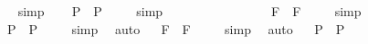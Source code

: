 \begin{isabellebody}
\isadelimproof
\ %
\endisadelimproof
%
\isatagproof
{}\isamarkupfalse%
\ simp\ \isamarkupfalse%
%
\endisatagproof
{\isafoldproof}%
%
\isadelimproof
%
\endisadelimproof
\isanewline
\ \isamarkupfalse%
\ {\isachardoublequoteopen}{\isacharbrackleft}\isactrlbold {\isasymbox}\isactrlbold {\isasymdiamond}{\isasymphi}\isactrlsup P\ \isactrlbold {\isasymrightarrow}\ \isactrlbold {\isasymdiamond}{\isasymphi}\isactrlsup P{\isacharbrackright}\ {\isacharequal}\ {\isasymtop}{\isachardoublequoteclose}%
\isadelimproof
\ %
\endisadelimproof
%
\isatagproof
{}\isamarkupfalse%
\ simp\ \isamarkupfalse%
\ \ \ \ \ \ \ \ \ \ \ \ %
%
\endisatagproof
{\isafoldproof}%
%
\isadelimproof
%
\endisadelimproof
\isanewline
\ \isamarkupfalse%
\ {\isachardoublequoteopen}{\isacharbrackleft}\isactrlbold {\isasymbox}\isactrlbold {\isasymdiamond}{\isasymphi}\isactrlsup F\ \isactrlbold {\isasymrightarrow}\ \isactrlbold {\isasymdiamond}{\isasymphi}\isactrlsup F{\isacharbrackright}\ {\isacharequal}\ {\isasymtop}{\isachardoublequoteclose}%
\isadelimproof
\ %
\endisadelimproof
%
\isatagproof
{}\isamarkupfalse%
\ simp\ \isamarkupfalse%
\ \ \ \ \ \ \ \ \ \ \ \ %
%
\endisatagproof
{\isafoldproof}%
%
\isadelimproof
%
\endisadelimproof
\isanewline
\ \isamarkupfalse%
\ {\isachardoublequoteopen}{\isacharbrackleft}\isactrlbold {\isasymdiamond}\isactrlbold {\isasymbox}{\isasymphi}\isactrlsup P\ \isactrlbold {\isasymrightarrow}\ \isactrlbold {\isasymdiamond}{\isasymphi}\isactrlsup P{\isacharbrackright}\ {\isacharequal}\ {\isasymtop}{\isachardoublequoteclose}%
\isadelimproof
\ %
\endisadelimproof
%
\isatagproof
{}\isamarkupfalse%
\ simp\ \isamarkupfalse%
\ auto%
\endisatagproof
{\isafoldproof}%
%
\isadelimproof
%
\endisadelimproof
\isanewline
\ \isamarkupfalse%
\ {\isachardoublequoteopen}{\isacharbrackleft}\isactrlbold {\isasymdiamond}\isactrlbold {\isasymbox}{\isasymphi}\isactrlsup F\ \isactrlbold {\isasymrightarrow}\ \isactrlbold {\isasymdiamond}{\isasymphi}\isactrlsup F{\isacharbrackright}\ {\isacharequal}\ {\isasymtop}{\isachardoublequoteclose}%
\isadelimproof
\ %
\endisadelimproof
%
\isatagproof
{}\isamarkupfalse%
\ simp\ \isamarkupfalse%
\ auto%
\endisatagproof
{\isafoldproof}%
%
\isadelimproof
%
\endisadelimproof
\isanewline
\ \isamarkupfalse%
\ {\isachardoublequoteopen}{\isacharbrackleft}\isactrlbold {\isasymbox}\isactrlbold {\isasymdiamond}{\isasymphi}\isactrlsup P\ \isactrlbold {\isasymrightarrow}\ \isactrlbold {\isasymbox}{\isasymphi}\isactrlsup P{\isacharbrackright}\ {\isacharequal}\ {\isasymtop}{\isachardoublequoteclose}%

\end{isabellebody}
